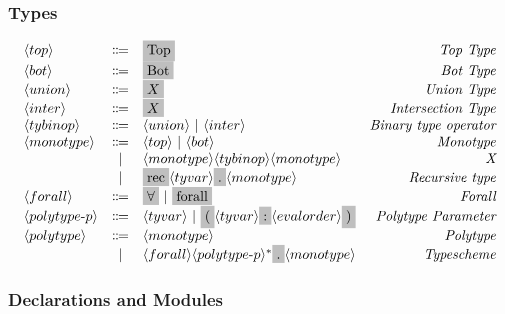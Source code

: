\documentclass[11pt]{article}
\newcommand{\nonterminal}[1]{\langle #1 \rangle}
\newcommand{\terminal}[1]{\colorbox{lightgray}{\vphantom{X}#1}}
\begin{document}
\subsubsection{Types}
\[
  \begin{array}{lclr}
    \nonterminal{top} & \Coloneqq & \terminal{Top} & \emph{Top Type} \\
    \nonterminal{bot} & \Coloneqq & \terminal{Bot} & \emph{Bot Type} \\
    \nonterminal{union} & \Coloneqq & \terminal{$X$} & \emph{Union Type} \\
    \nonterminal{inter} & \Coloneqq & \terminal{$X$} & \emph{Intersection Type} \\
    \nonterminal{tybinop} & \Coloneqq & \nonterminal{union}\ |\ \nonterminal{inter} & \emph{Binary type operator} \\
    \nonterminal{monotype} & \Coloneqq & \nonterminal{top}\ |\ \nonterminal{bot} & \emph{Monotype} \\
    & | & \nonterminal{monotype} \nonterminal{tybinop} \nonterminal{monotype} & \emph{X} \\
    & | & \terminal{rec} \nonterminal{tyvar} \terminal{.} \nonterminal{monotype} & \emph{Recursive type} \\
    \nonterminal{forall} & \Coloneqq & \terminal{$\forall$}\ |\ \terminal{forall} & \emph{Forall} \\
    \nonterminal{polytype$-$p} & \Coloneqq & \nonterminal{tyvar}\ |\ \terminal{(} \nonterminal{tyvar} \terminal{:} \nonterminal{evalorder}\terminal{)} & \emph{Polytype Parameter} \\
    \nonterminal{polytype} & \Coloneqq & \nonterminal{monotype} & \emph{Polytype} \\
    & | & \nonterminal{forall} \nonterminal{polytype$-$p}^{\ast}\terminal{.} \nonterminal{monotype} & \emph{Typescheme} \\
  \end{array}
\]
\subsubsection{Declarations and Modules}
\end{document}
